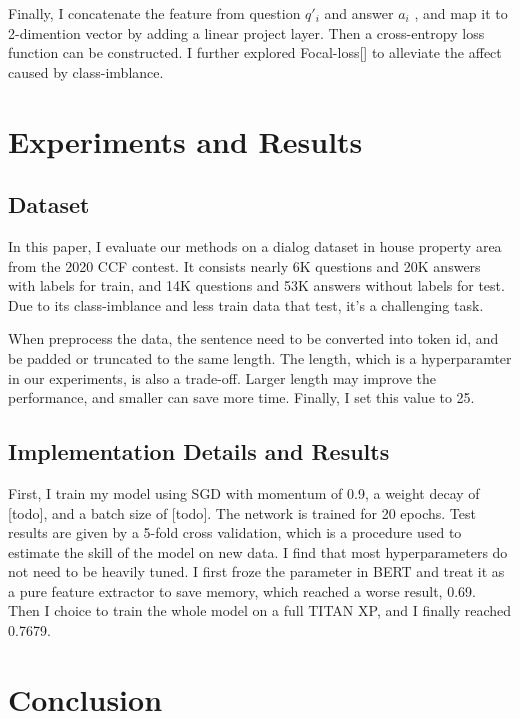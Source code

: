 \documentclass{article}%
\begin{document}
%

%
Finally, I concatenate the feature from question  $q'_i$  and answer  $a_i$ , and map it to 2{-}dimention vector by adding a linear project layer. Then a cross{-}entropy loss function can be constructed. I further explored Focal{-}loss{[}{]} to alleviate the affect caused by class{-}imblance.%

%

%
\section{Experiments and Results}%

%
\subsection{Dataset}%

%
In this paper, I evaluate our methods on a dialog dataset in house property area from the 2020 CCF contest. It consists nearly 6K questions and 20K answers with labels for train, and 14K questions and 53K answers without labels for test. Due to its class{-}imblance and less train data that test, it's a challenging task.%

%
When preprocess the data, the sentence need to be converted into token id, and be padded or truncated to the same length. The length, which is a hyperparamter in our experiments, is also a trade{-}off. Larger length may improve the performance, and smaller can save more time. Finally, I set this value to 25.%

%

%
\subsection{Implementation Details and Results}%

%
First, I train my model using SGD with momentum of 0.9, a weight decay of {[}todo{]}, and a batch size of {[}todo{]}. The network is trained for 20 epochs. Test results are given by a 5{-}fold cross validation, which is a procedure used to estimate the skill of the model on new data. I find that most hyperparameters do not need to be heavily tuned. I first froze the parameter in BERT and treat it as a pure feature extractor to save memory, which reached a worse result, 0.69. Then I choice to train the whole model on a full TITAN XP, and I finally reached 0.7679.%

%

%
\section{Conclusion}%
\end{document}
